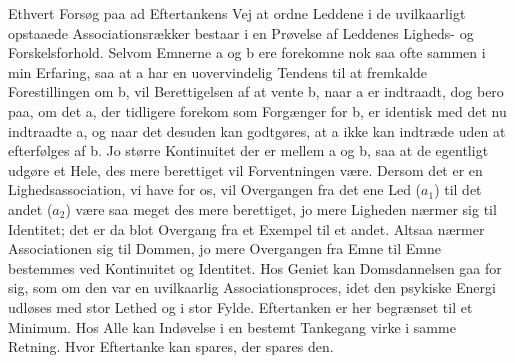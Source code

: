 \documentclass[12pt,a4paper]{book}
\newcommand{\apage}[1]{\marginnote{\footnotesize\textit{[#1]}}}
\begin{document}
Ethvert Forsøg paa ad Eftertankens Vej at ordne Leddene i de
uvilkaarligt opstaaede Associationsrækker bestaar i en Prøvelse af
Leddenes Ligheds- og Forskelsforhold. Selvom Emnerne a og b ere
forekomne nok saa ofte sammen i min Erfaring, saa at a har en
uovervindelig Tendens til at fremkalde Forestillingen om b, vil
Berettigelsen af at vente b, naar a er indtraadt, dog bero paa, om det a,
der tidligere forekom som Forgænger for b, er identisk med det nu
indtraadte a, og naar det desuden kan godtgøres, at a ikke kan indtræde
uden at efterfølges af b. Jo større Kontinuitet der er mellem a og b, saa
at de egentligt udgøre et Hele, des mere berettiget vil Forventningen
være. Dersom det er en Lighedsassociation, vi have for os, vil Overgangen
fra det \apage{61} ene Led ($a_1$) til det andet ($a_2$) være saa meget des mere
berettiget, jo mere Ligheden nærmer sig til Identitet; det er da blot
Overgang fra et Exempel til et andet. Altsaa nærmer Associationen sig til
Dommen, jo mere Overgangen fra Emne til Emne bestemmes ved Kontinuitet og
Identitet. Hos Geniet kan Domsdannelsen gaa for sig, som om den var en
uvilkaarlig Associationsproces, idet den psykiske Energi udløses med stor
Lethed og i stor Fylde. Eftertanken er her begrænset til et Minimum. Hos
Alle kan Indøvelse i en bestemt Tankegang virke i samme Retning. Hvor
Eftertanke kan spares, der spares den.
\end{document}
